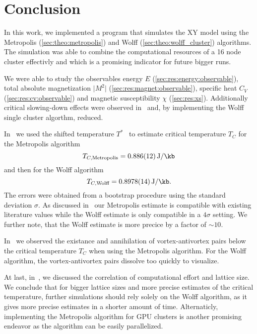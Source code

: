 \chapter{Conclusion}
	In this work, we implemented a program that simulates the XY model using the Metropolis (\cref{sec:theo:metropolis}) and Wolff (\cref{sec:theo:wolff_cluster}) algorithms. The simulation was able to combine the computational resources of a 16 node cluster effectivly and which is a promising indicator for future bigger runs.
	
	We were able to study the observables energy $E$ (\cref{sec:res:energy:observable}), total absolute magnetization $\lvert M^2 \rvert$ (\cref{sec:res:magnet:observable}), specific heat $C_V$ (\cref{sec:res:cv:observable}) and magnetic susceptibility $\chi$ (\cref{sec:res:xs}). Additionally critical slowing-down effects were observed in~ and, by implementing the Wolff single cluster algorthm, reduced.
	
	In~ we used the shifted temperature $T^*$~\citep{shifted} to estimate critical temperature $T_C$ for the Metropolis algorithm
	\begin{equation}
		T_{C, \text{Metropolis}} = \SI{0.886(12)}{\J\per\kb}
	\end{equation}
	and then for the Wolff algorithm
	\begin{equation}
		T_{C, \text{Wolff}} = \SI{0.8978(14)}{\J\per\kb}.
	\end{equation}
	The errors were obtained from a bootstrap procedure using the standard deviation $\sigma$. As discussed in~ our Metropolis estimate is compatible with existing literature values while the Wolff estimate is only compatible in a $4\sigma$ setting. We further note, that the Wolff estimate is more precice by a factor of $\sim 10$.
	
	In~ we observed the existance and annihilation of vortex-antivortex pairs below the critical temperature $T_C$ when using the Metropolis algorithm. For the Wolff algorithm, the vortex-antivortex pairs dissolve too quickly to visualize.
	
	At last, in~, we discussed the correlation of computational effort and lattice size. We conclude that for bigger lattice sizes and more precise estimates of the critical temperature, further simulations should rely solely on the Wolff algorithm, as it gives more precise estimates in a shorter amount of time. Alternaticly, implementing the Metropolis algorithm for GPU clusters is another promising endeavor as the algorithm can be easily parallelized.